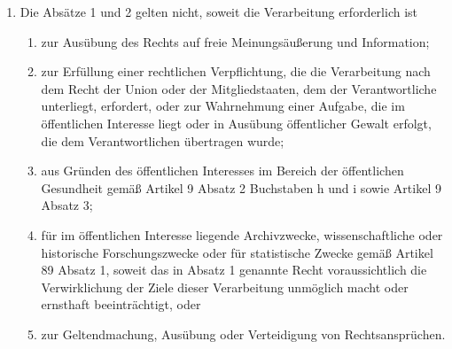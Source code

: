 \documentclass[A4, 12pt]{scrbook}
\begin{document}
\begin{enumerate}[label=(\arabic*)]
            \item Die Absätze 1 und 2 gelten nicht, soweit die Verarbeitung erforderlich ist
                \begin{enumerate}[label=\alph*)]
                    \item zur Ausübung des Rechts auf freie Meinungsäußerung und Information;
                    \item zur Erfüllung einer rechtlichen Verpflichtung, die die Verarbeitung nach dem Recht der Union oder der Mitgliedstaaten, dem der Verantwortliche unterliegt, erfordert, oder zur Wahrnehmung einer Aufgabe, die im öffentlichen Interesse liegt oder in Ausübung öffentlicher Gewalt erfolgt, die dem Verantwortlichen übertragen wurde;
                    \item aus Gründen des öffentlichen Interesses im Bereich der öffentlichen Gesundheit gemäß Artikel 9 Absatz 2 Buchstaben h und i sowie Artikel 9 Absatz 3; 
                    \item für im öffentlichen Interesse liegende Archivzwecke, wissenschaftliche oder historische Forschungszwecke oder für statistische Zwecke gemäß Artikel 89 Absatz 1, soweit das in Absatz 1 genannte Recht voraussichtlich die Verwirklichung der Ziele dieser Verarbeitung unmöglich macht oder ernsthaft beeinträchtigt, oder 
                    \item zur Geltendmachung, Ausübung oder Verteidigung von Rechtsansprüchen. 
                \end{enumerate}
        \end{enumerate}
\end{document}
